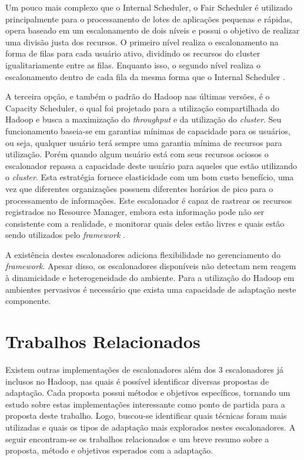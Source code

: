 Um pouco mais complexo que o Internal Scheduler, o Fair Scheduler é utilizado principalmente para o processamento de lotes de aplicações pequenas e rápidas, opera baseado em um escalonamento de dois níveis e possui o objetivo de realizar uma divisão justa dos recursos. O primeiro nível realiza o escalonamento na forma de filas para cada usuário ativo, dividindo os recursos do cluster igualitariamente entre as filas. Enquanto isso, o segundo nível realiza o escalonamento dentro de cada fila da mesma forma que o Internal Scheduler \cite{FairScheduler}. 

A terceira opção, e também o padrão do Hadoop nas últimas versões, é o Capacity Scheduler, o qual foi projetado para a utilização compartilhada do Hadoop e busca a maximização do \textit{throughput} e da utilização do \textit{cluster}. Seu funcionamento baseia-se em garantias mínimas de capacidade para os usuários, ou seja, qualquer usuário terá sempre uma garantia mínima de recursos para utilização. Porém quando algum usuário está com seus recursos ociosos o escalonador repassa a capacidade deste usuário  para aqueles que estão utilizando o \textit{cluster}. Esta estratégia fornece elasticidade com um bom custo benefício, uma vez que diferentes organizações possuem diferentes horários de pico para o processamento de informações. Este escalonador é capaz de rastrear os recursos registrados no Resource Manager, embora esta informação pode não ser consistente com a realidade, e monitorar quais deles estão livres e quais estão sendo utilizados pelo \textit{framework} \cite{CapacityScheduler}.

A existência destes escalonadores adiciona flexibilidade no gerenciamento do \textit{framework}. Apesar disso, os escalonadores disponíveis não detectam nem reagem à dinamicidade e heterogeneidade do ambiente. Para a utilização do Hadoop em ambientes pervasivos é necessário que exista uma capacidade de adaptação neste componente.



\section{Trabalhos Relacionados}
Existem outras implementações de escalonadores além dos 3 escalonadores já inclusos no Hadoop, nas quais é possível identificar diversas propostas de adaptação. Cada proposta possui métodos e objetivos específicos, tornando um estudo sobre estas implementações interessante como ponto de partida para a proposta deste trabalho. Logo, buscou-se identificar quais técnicas foram mais utilizadas e quais os tipos de adaptação mais explorados nestes escalonadores. A seguir encontram-se os trabalhos relacionados e um breve resumo sobre a proposta, método e objetivos esperados com a adaptação.


